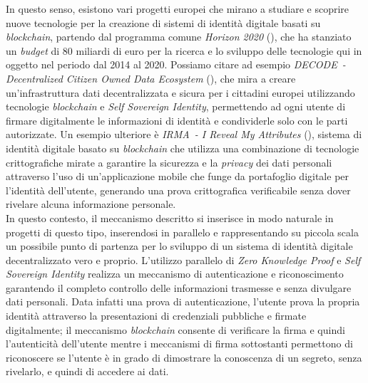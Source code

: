 In questo senso, esistono vari progetti europei che mirano a studiare e scoprire nuove tecnologie per la creazione di sistemi di identità digitale basati su \textit{blockchain}, partendo dal programma comune \textit{Horizon 2020} (\cite{site:horizon2020}),
che ha stanziato un \textit{budget} di 80 miliardi di euro per la ricerca e lo sviluppo delle tecnologie qui in oggetto nel periodo dal 2014 al 2020.
Possiamo citare ad esempio \textit{DECODE~- Decentralized Citizen Owned Data Ecosystem} (\cite{site:decode}), che mira a creare un'infrastruttura  dati decentralizzata e sicura per i cittadini europei
utilizzando tecnologie \textit{blockchain} e \textit{Self Sovereign Identity}, permettendo ad ogni utente di firmare digitalmente le informazioni di identità e condividerle solo con le parti autorizzate.
Un esempio ulteriore è \textit{IRMA~- I Reveal My Attributes} (\cite{site:irma}), sistema di identità digitale basato su \textit{blockchain} che utilizza una combinazione di tecnologie crittografiche mirate a garantire la sicurezza e la \textit{privacy} dei dati personali attraverso l'uso di un'applicazione mobile 
che funge da portafoglio digitale per l'identità dell'utente, generando una prova crittografica verificabile senza dover rivelare alcuna informazione personale. \\

In questo contesto, il meccanismo descritto si inserisce in modo naturale in progetti di questo tipo, inserendosi in parallelo e rappresentando su piccola scala un possibile punto di partenza per lo sviluppo di un sistema di identità digitale decentralizzato vero e proprio.
L'utilizzo parallelo di \textit{Zero Knowledge Proof} e \textit{Self Sovereign Identity} realizza un meccanismo di autenticazione e riconoscimento garantendo il completo controllo delle informazioni trasmesse e senza divulgare dati personali.
Data infatti una prova di autenticazione, l'utente prova la propria identità attraverso la presentazioni di credenziali pubbliche e firmate digitalmente; il meccanismo \textit{blockchain} consente di verificare la firma e quindi l'autenticità dell'utente
mentre i meccanismi di firma sottostanti permettono di riconoscere se l'utente è in grado di dimostrare la conoscenza di un segreto, senza rivelarlo, e quindi di accedere ai dati. \\

